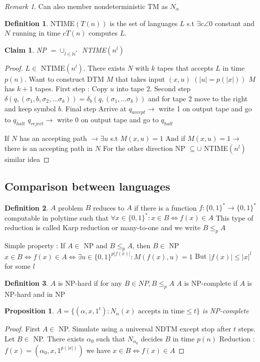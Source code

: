 \documentclass{article}
\newtheorem{proposition}{Proposition}
\newtheorem{claim}{Claim}
\theoremstyle{definition}
\newtheorem{definition}{Definition}
\theoremstyle{remark}
\newtheorem*{remark}{Remark}
\begin{document}
\begin{remark}
	Can also member nondeterministic TM as $N_\alpha$
\end{remark}

\begin{definition}
	NTIME$(T(n))$ is the set of languages $L$ s.t $\exists c \angle 0$ constant and $N$ running in time $cT(n)$ computes $L$.
\end{definition}

\begin{claim}
	NP $= \cup_{l\in \mathbb{N}^*}$ NTIME$(n^l)$
\end{claim}

\begin{proof}
	$L \in$ NTIME$(n^l)$. There exists $N$ with $k$ tapes that accepts $L$ in time $p(n)$.
	Want to construct DTM $M$ that takes input $(x,u)$ $(|u|=p(|x|))$
	$M$ has $k+1$ tapes.
	First step : Copy $u$ into tape 2.
	Second step $\delta(q,(\sigma_1,b,\sigma_2,...\sigma_k)) = \delta_b(q,(\sigma_1,...\sigma_k))$
															  and for tape 2 move to the right and keep symbol $b$.
	Final step
		Arrive at $q_{accept} \rightarrow$ write 1 on output tape and go to $q_{halt}$
				  $q_{reject} \rightarrow$ write 0 on output tape and go to $q_{halt}$
	
	If $N$ has an accepting path $\rightarrow \exists u$ s.t $M(x,u) = 1$
	And if $M(x,u) = 1 \rightarrow$ there is an accepting path in $N$
	For the other direction
	NP $\subseteq \cup$ NTIME$(n^l)$
	similar idea
\end{proof}

\subsection{Comparison between languages}
\begin{definition}
	$A$ problem $B$ reduces to $A$ if there is a function $f:\{0,1\}^* \rightarrow \{0,1\}^*$ computable in polytime such that $\forall x \in \{0,1\}^* : x \in B \Leftrightarrow f(x) \in A$
This type of reduction is called Karp reduction or many-to-one and we write $B \leq_p A$
\end{definition}

Simple property : If $A \in$ NP and $B \leq_p A$, then $B \in$ NP
	$x \in B \Leftrightarrow f(x) \in A \Leftrightarrow \exists u \in \{0,1\}^{p|f(x)|} : M(f(x),u) = 1$
	But $|f(x)| \leq |x|^l$ for some $l$
	
\begin{definition}
	$A$ is NP-hard if for any $B \in NP, B \leq_p A$
	$A$ is NP-complete if $A$ is NP-hard and in NP
\end{definition}
\begin{proposition}
	$A = \{(\alpha,x,1^t) : N_\alpha(x) \text{ accepts in time} \leq t\}$ is NP-complete
\end{proposition}
\begin{proof}
	First $A \in$ NP. Simulate using a universal NDTM except stop after $t$ steps.
	Let $B \in$ NP. There exists $\alpha_0$ such that $N_{\alpha_0}$ decides $B$ in time $p(n)$
	Reduction : $f(x) = (\alpha_0,x,1^{p(|x|)})$
	we have $x \in B \Leftrightarrow f(x) \in A$
\end{proof}
\end{document}
